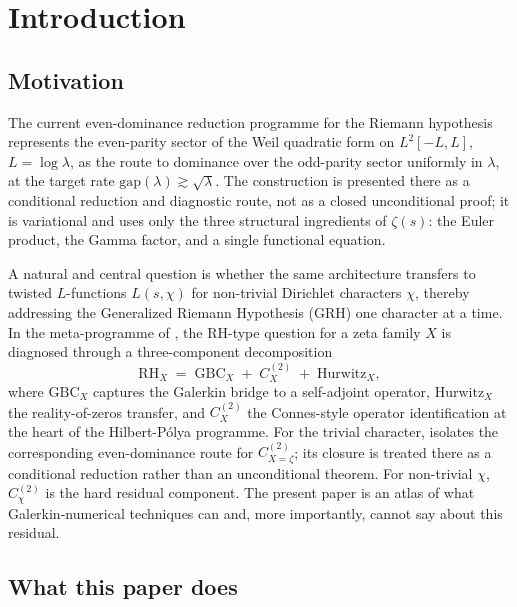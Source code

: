 \documentclass[a4paper,10pt,twocolumn]{article}
\theoremstyle{definition}
\theoremstyle{remark}
\newcommand{\chifn}{\chi}
\begin{document}
\section{Introduction}
\label{sec:intro}

\subsection{Motivation}
\label{sec:intro-motivation}

The current even-dominance reduction programme for the Riemann hypothesis
\cite{RH_II} represents the even-parity sector of the Weil quadratic form
on $L^2[-L,L]$, $L=\log\lambda$, as the route to dominance over the
odd-parity sector uniformly in $\lambda$, at the target rate
$\mathrm{gap}(\lambda)\gtrsim\sqrt{\lambda}$. The construction is
presented there as a conditional reduction and diagnostic route, not as
a closed unconditional proof; it is variational and uses only the three
structural ingredients of $\zeta(s)$: the Euler product, the Gamma factor,
and a single functional equation.

A natural and central question is whether the same architecture
transfers to twisted $L$-functions $L(s,\chi)$ for non-trivial
Dirichlet characters $\chi$, thereby addressing the Generalized
Riemann Hypothesis (GRH) one character at a time. In the meta-programme
of \cite{MetaGalerkinBridge}, the RH-type question for a zeta family
$X$ is diagnosed through a three-component decomposition
\begin{equation}
\label{eq:three-component}
  \mathrm{RH}_X
    \;=\;
  \mathrm{GBC}_X \;+\; C^{(2)}_X \;+\; \mathrm{Hurwitz}_X,
\end{equation}
where $\mathrm{GBC}_X$ captures the Galerkin bridge to a self-adjoint
operator, $\mathrm{Hurwitz}_X$ the reality-of-zeros transfer, and
$C^{(2)}_X$ the Connes-style operator identification at the heart of the
Hilbert-P\'olya programme. For the trivial character, \cite{RH_II}
isolates the corresponding even-dominance route for
$C^{(2)}_{X=\zeta}$; its closure is treated there as a conditional
reduction rather than an unconditional theorem. For non-trivial $\chi$,
$C^{(2)}_{\chifn}$ is the hard residual component. The present paper is
an atlas of what Galerkin-numerical techniques can and, more importantly,
cannot say about this residual.

\subsection{What this paper does}
\label{sec:intro-contribution}
\end{document}

